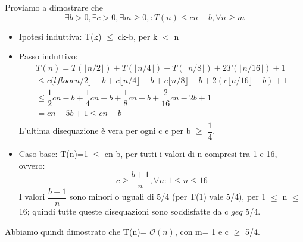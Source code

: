 \documentclass[../cheatSheetAlgoritmi.tex]{subfiles}
\begin{document}
Proviamo a dimostrare che 
\begin{equation*}
  \exists b \text{$>$} 0, \exists c \text{$>$} 0, \exists m \text{$\geq$} 0, : T(n) \text{$\leq$} cn-b, \forall n \text{$\geq$} m
\end{equation*}
\begin{itemize}
	\item Ipotesi induttiva: T(k) $\leq$ ck-b, per k $<$ n
	\item Passo induttivo:
	\begin{equation*}
		\begin{aligned}	
			T(n)= T(\lfloor n/2 \rfloor) + T(\lfloor n/4 \rfloor)+ T(\lfloor n/8 \rfloor)+ 2T(\lfloor n/16 \rfloor) + 1\\
			\text{$\leq$} c(lfloor n/2 \rfloor -b + c\lfloor n/4 \rfloor -b+ c\lfloor n/8 \rfloor -b + 2(c \lfloor n/16 \rfloor -b) + 1\\ 
			\text{$\leq$}  \dfrac{1}{2}cn -b + \dfrac{1}{4}cn -b + \dfrac{1}{8}cn -b + \dfrac{2}{16}cn -2b + 1\\
=  cn -5b + 1 \text{$\leq$} cn -b \\
		\end{aligned}
	\end{equation*}
	L'ultima disequazione è vera per ogni c e per b $\geq$ $\dfrac{1}{4}$. 
	\item Caso base: T(n)=1 $\leq$ cn-b, per tutti i valori di n compresi tra 1 e 16, ovvero: 
	\begin{equation*}
		c \text{$\geq$} \dfrac{b+1}{n}, \forall n: 	\text{$1 \leq n \leq 16$}
	\end{equation*}
	I valori $\dfrac{b+1}{n}$ sono minori o uguali di 5/4 (per T(1) vale 5/4), per 1 $\leq$ n $\leq$ 16; quindi tutte queste disequazioni sono soddisfatte da c $geq$ 5/4. 
\end{itemize}
Abbiamo quindi dimostrato che T(n)= $\mathcal{O}(n)$, con m= 1 e c $\geq$ 5/4.
  
\end{document}
